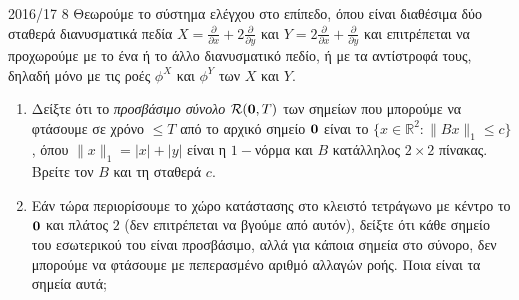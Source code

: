 \begin{exercise}{2016/17 8}
    Θεωρούμε το σύστημα ελέγχου στο επίπεδο, όπου είναι διαθέσιμα δύο σταθερά
    διανυσματικά πεδία \( X = \frac{\partial}{\partial x} +
    2\frac{\partial}{\partial y} \) και \( Y = 2\frac{\partial}{\partial x}
    + \frac{\partial}{\partial y} \) και επιτρέπεται να προχωρούμε με το ένα ή
    το άλλο διανυσματικό πεδίο, ή με τα αντίστροφά τους, δηλαδή μόνο με τις ροές
    \( \phi^X \) και \( \phi^Y \) των \( X \) και \( Y \).
    \begin{enumerate}[label= (\alph*)]
        \item Δείξτε ότι το \emph{προσβάσιμο σύνολο} \( \mathcal{R}(\bm{0}, T)
            \) των σημείων που μπορούμε να φτάσουμε σε χρόνο \( \leq T \) από το
            αρχικό σημείο \( \bm{0} \) είναι το \( \{x\in\mathbb{R}^2: \|Bx\|_1
            \leq c \} \), όπου \( \|x\|_1 = |x| + |y| \) είναι η \(1-\)νόρμα και
            \( B \) κατάλληλος \( 2 \times 2 \) πίνακας. Βρείτε τον \( B \) και
            τη σταθερά \( c \).
        \item Εάν τώρα περιορίσουμε το χώρο κατάστασης στο κλειστό τετράγωνο με
            κέντρο το \( \bm{0} \) και πλάτος \( 2 \) (δεν επιτρέπεται να βγούμε
            από αυτόν), δείξτε ότι κάθε σημείο του εσωτερικού του είναι
            προσβάσιμο, αλλά για κάποια σημεία στο σύνορο, δεν μπορούμε να
            φτάσουμε με πεπερασμένο αριθμό αλλαγών ροής. Ποια είναι τα σημεία
            αυτά;
    \end{enumerate}
\end{exercise}
